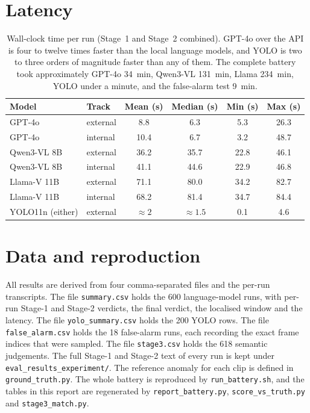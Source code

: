 \documentclass[11pt,a4paper]{article}
\begin{document}
\appendix
\section{Latency}

\begin{table}[h]
\centering
\begin{tabular}{@{}l l c c c c@{}}
\toprule
Model & Track & Mean (s) & Median (s) & Min (s) & Max (s) \\
\midrule
GPT-4o          & external & 8.8  & 6.3  & 5.3  & 26.3 \\
GPT-4o          & internal & 10.4 & 6.7  & 3.2  & 48.7 \\
Qwen3-VL 8B     & external & 36.2 & 35.7 & 22.8 & 46.1 \\
Qwen3-VL 8B     & internal & 41.1 & 44.6 & 22.9 & 46.8 \\
Llama-V 11B     & external & 71.1 & 80.0 & 34.2 & 82.7 \\
Llama-V 11B     & internal & 68.2 & 81.4 & 34.7 & 84.4 \\
YOLO11n (either)& external & $\approx 2$ & $\approx 1.5$ & 0.1 & 4.6 \\
\bottomrule
\end{tabular}
\caption{Wall-clock time per run (Stage~1 and Stage~2 combined). GPT-4o
over the API is four to twelve times faster than the local language
models, and YOLO is two to three orders of magnitude faster than any of
them. The complete battery took approximately GPT-4o 34~min, Qwen3-VL
131~min, Llama 234~min, YOLO under a minute, and the false-alarm test
9~min.}
\label{tab:latency}
\end{table}

\section{Data and reproduction}

All results are derived from four comma-separated files and the per-run
transcripts. The file \texttt{summary.csv} holds the 600 language-model
runs, with per-run Stage-1 and Stage-2 verdicts, the final verdict, the
localised window and the latency. The file \texttt{yolo\_summary.csv}
holds the 200 YOLO rows. The file \texttt{false\_alarm.csv} holds the 18
false-alarm runs, each recording the exact frame indices that were
sampled. The file \texttt{stage3.csv} holds the 618 semantic judgements.
The full Stage-1 and Stage-2 text of every run is kept under
\texttt{eval\_results\_experiment/}. The reference anomaly for each clip
is defined in \texttt{ground\_truth.py}. The whole battery is reproduced
by \texttt{run\_battery.sh}, and the tables in this report are regenerated
by \texttt{report\_battery.py}, \texttt{score\_vs\_truth.py} and
\texttt{stage3\_match.py}.
\end{document}
